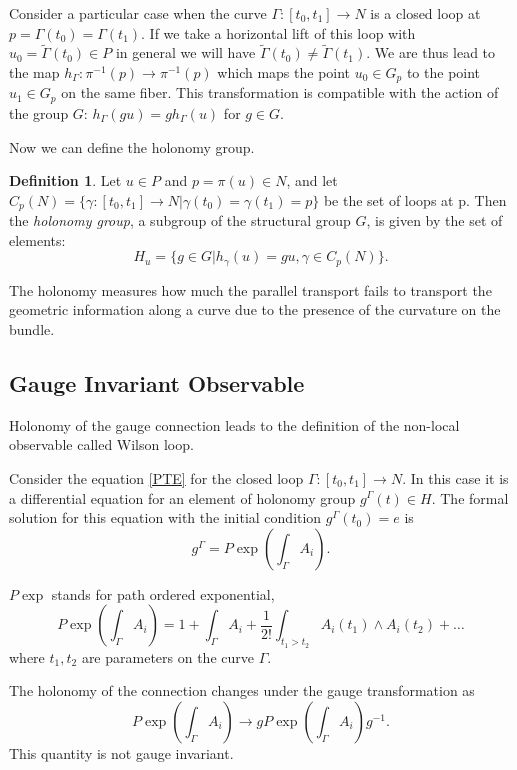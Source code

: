 \documentclass[11pt]{report}
\theoremstyle{plain}
\theoremstyle{definition}
\newtheorem{defn}[thm]{Definition}
\theoremstyle{remark}
\theoremstyle{remark}
\numberwithin{equation}{section}
\begin{document}
Consider a particular case when the curve $\Gamma : [t_0,t_1] \to N$ is a closed loop at $p = \Gamma(t_0) = \Gamma (t_1)$. If we take a horizontal lift of this loop with $u_0 = \tilde{\Gamma}(t_0) \in P$ in general we will have $\tilde{\Gamma}(t_0) \ne \tilde{\Gamma}(t_1)$. We are thus lead to the map $h_{\Gamma} : \pi^{-1}(p) \to \pi^{-1}(p)$ which maps the point $u_0 \in G_p$ to the point $u_1 \in G_p$ on the same fiber. This transformation is compatible with the action of the group $G$: $h_{\Gamma}(gu) = g h_{\Gamma}(u)$ for $g \in G$. 

Now we can define the holonomy group. 
\begin{defn}
Let $u\in P$ and $p=\pi (u) \in N$, and let $C_p(N) = \{ \gamma : [t_0,t_1] \to N | \gamma(t_0) = \gamma (t_1) = p\}$ be the set of loops at p. Then the \textit{holonomy group}, a subgroup of the structural group $G$, is given by the set of elements:
$$H_u = \{ g\in G | h_{\gamma}(u) = gu, \gamma \in C_p(N)\}.$$
\end{defn}

The holonomy measures how much the parallel transport fails to transport the geometric information along a curve due to the presence of the curvature on the bundle. 



\subsection{Gauge Invariant Observable}

Holonomy of the gauge connection leads to the definition of the non-local observable called Wilson loop. 

Consider the equation \eqref{PTE} for the closed loop $\Gamma : [t_0,t_1] \to N$. In this case it is a differential equation  for an element of holonomy group $g^{\Gamma}(t) \in H$. The formal solution for this equation with the initial condition $g^{\Gamma}(t_0) = e$ is 
\begin{equation}
g^{\Gamma} = P\exp\left(\int_\Gamma A_i\right).
\end{equation}

$P \exp$ stands for  path ordered exponential,
%
\begin{equation}
P\exp\left( \int_\Gamma A_i\right) = 1 + \int_\Gamma A_i + \frac{1}{2!} \int_{t_1 > t_2} A_i(t_1) \wedge A_i(t_2) + \dots
\end{equation}
where $t_1, t_2$ are parameters on the curve $\Gamma$.

The holonomy of the connection changes under the gauge transformation as 
\begin{equation}
P\exp\left(\int_\Gamma A_i\right) \to gP\exp\left(\int_\Gamma A_i\right)g^{-1}.
\end{equation}
This quantity is not gauge invariant. 
\end{document}
